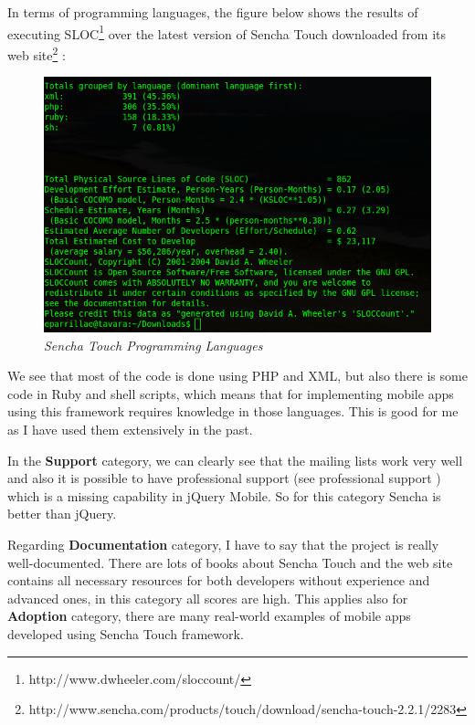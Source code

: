 \documentclass[a4paper,12pt]{book}
\begin{document}
In terms of programming languages, the figure below shows the results of executing SLOC\footnote{http://www.dwheeler.com/sloccount/} over the latest version of Sencha Touch downloaded from its web site\footnote{http://www.sencha.com/products/touch/download/sencha-touch-2.2.1/2283} :

\begin{figure}[H]
    \centering
    \includegraphics[width=15cm, keepaspectratio]{img/senchasloccount.png}
    \caption{\textit{Sencha Touch Programming Languages}}
    \label{figure:jquerylanguages}
 \end{figure}

We see that most of the code is done using PHP and XML, but also there is some code in Ruby and shell scripts, which means that for implementing mobile apps using this framework requires knowledge in those languages. This is good for me as I have used them extensively in the past.

In the \textbf{Support} category, we can clearly see that the mailing lists work very well and also it is possible to have professional support (see professional support \cite{sencha support}) which is a missing capability in jQuery Mobile. So for this category Sencha is better than jQuery.

Regarding \textbf{Documentation} category, I have to say that the project is really well-documented. There are lots of books about Sencha Touch and the web site contains all necessary resources for both developers without experience and advanced ones, in this category all scores are high. This applies also for \textbf{Adoption} category, there are many real-world examples of mobile apps developed using Sencha Touch framework.
\end{document}
